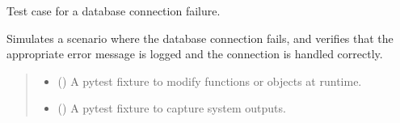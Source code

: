 \documentclass[letterpaper,10pt,english]{sphinxmanual}
\begin{document}

\begin{fulllineitems}
\label{\detokenize{test.data_storage:test.data_storage.test_create_table.test_create_table_connection_failure}}
\pysigstartsignatures
\pysiglinewithargsret
{}
{\sphinxparamcomma {}}
{}
\pysigstopsignatures
\sphinxAtStartPar
Test case for a database connection failure.

\sphinxAtStartPar
Simulates a scenario where the database connection fails, and verifies
that the appropriate error message is logged and the connection is handled correctly.
\begin{quote}\begin{description}
\begin{itemize}
\item {} 
\sphinxAtStartPar
{} () \textendash{} A pytest fixture to modify functions or objects at runtime.

\item {} 
\sphinxAtStartPar
{} () \textendash{} A pytest fixture to capture system outputs.

\end{itemize}

\end{description}\end{quote}

\end{fulllineitems}

\end{document}
